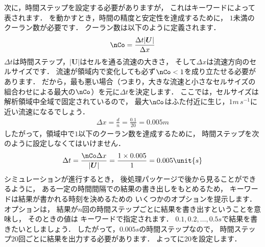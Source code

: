 次に，時間ステップを設定する必要がありますが，
これはキーワードによって表されます．
を動かすとき，時間の精度と安定性を達成するために，
$1$未満のクーラン数が必要です．
%
クーラン数は以下のように定義されます．
\begin{align}
 \label{eq:2.2}
  \nCo = \frac{\Delta t|\bm{U}|}{\Delta x}
\end{align}
$\Delta t$は時間ステップ，$|\bm{U}|$はセルを通る流速の大きさ，
そして$\Delta x$は流速方向のセルサイズです．
流速が領域内で変化しても必ず$\nCo < 1$を成り立たせる必要があります．
だから，最も悪い場合（つまり，大きな流速と小さなセルサイズの
組合わせによる最大の$\nCo$）を元に$\Delta t$を決定します．
ここでは，セルサイズは解析領域中全域で固定されているので，
最大$\nCo$はふた付近に生じ，$1\unit{m\,s^{-1}}$に近い流速になるでしょう．
\begin{align}
 \label{eq:2.3}
  \Delta x = \frac{d}{n} = \frac{0.1}{20} = 0.005\unit{m}
\end{align}
したがって，領域中で$1$以下のクーラン数を達成するために，
%
時間ステップを次のように設定しなくてはいけません．
\begin{align}
 \label{eq:2.4}
  \Delta t = \frac{\nCo\Delta x}{|\bm{U}|}
  = \frac{1 \times 0.005}{1} = 0.005\unit{s}
\end{align}
シミュレーションが進行するとき，
後処理パッケージで後から見ることができるように，
ある一定の時間間隔での結果の書き出しをもとめるため，
%
%
キーワードは結果が書かれる時刻を決めるための
いくつかのオプションを提示します．
%
%
オプションは，
結果が$n$回の時間ステップごとに結果を書き出すということを意味し，
そのときの値は
%
%
キーワードで指定されます．
$0.1, 0.2, \ldots, 0.5\unit{s}$で結果を書きたいとしましょう．
したがって，$0.005\unit{s}$の時間ステップなので，
時間ステップ$20$回ごとに結果を出力する必要があります．
よってに20を設定します．

